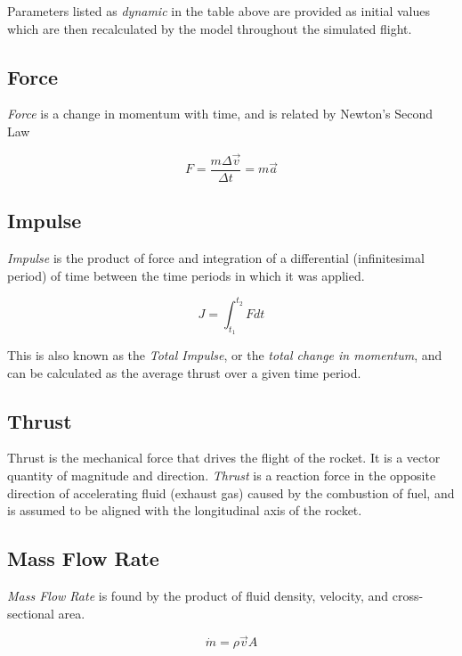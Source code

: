 \documentclass[]{book}
\begin{document}
Parameters listed as \emph{dynamic} in the table above are provided as
initial values which are then recalculated by the model throughout the
simulated flight.

\subsection{Force}\label{force}

\emph{Force} is a change in momentum with time, and is related by
Newton's Second Law

\begin{equation}
F = \dfrac{m \Delta \vec{v}}{\Delta t} = m\vec{a}
\end{equation}

\subsection{Impulse}\label{impulse}

\emph{Impulse} is the product of force and integration of a differential
(infinitesimal period) of time between the time periods in which it was
applied.

\begin{equation}
\label{impulse}
J = \int^{t_2}_{t_1} F dt
\end{equation}

This is also known as the \emph{Total Impulse}, or the \emph{total
change in momentum}, and can be calculated as the average thrust over a
given time period.

\subsection{Thrust}\label{thrust}

Thrust is the mechanical force that drives the flight of the rocket. It
is a vector quantity of magnitude and direction. \emph{Thrust} is a
reaction force in the opposite direction of accelerating fluid (exhaust
gas) caused by the combustion of fuel, and is assumed to be aligned with
the longitudinal axis of the rocket.

\subsection{Mass Flow Rate}\label{mass-flow-rate}

\emph{Mass Flow Rate} is found by the product of fluid density,
velocity, and cross-sectional area.

\begin{equation} 
\dot{m} = \rho \vec{v} A
\end{equation}
\end{document}
